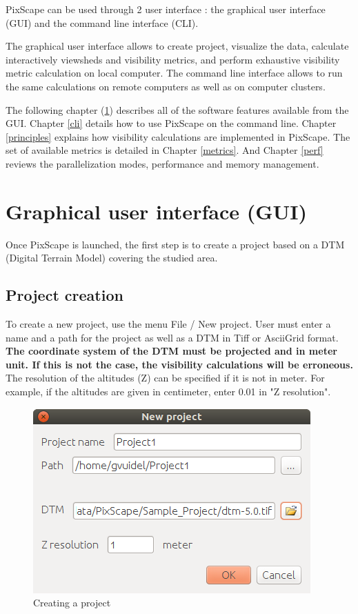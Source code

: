 \documentclass{report}
\begin{document}
PixScape can be used through 2 user interface : the graphical user interface (GUI) and the command line interface (CLI).

The graphical user interface allows to create project, visualize the data, calculate interactively viewsheds and visibility metrics, and perform exhaustive visibility metric calculation on local computer. The command line interface allows to run the same calculations on remote computers as well as on computer clusters.

The following chapter (\ref{gui}) describes all of the software features available from the GUI. Chapter \ref{cli} details how to use PixScape on the command line. Chapter \ref{principles} explains how visibility calculations are implemented in PixScape. The set of available metrics is detailed in Chapter \ref{metrics}. And Chapter \ref{perf} reviews the parallelization modes, performance and memory management.


\chapter{Graphical user interface (GUI)}
\label{gui}

Once PixScape is launched, the first step is to create a project based on a DTM (Digital Terrain Model) covering the studied area.

\section{Project creation}

To create a new project, use the menu File / New project. User must enter a name and a path for the project as well as a DTM in Tiff or AsciiGrid format. \textbf{The coordinate system of the DTM must be projected and in meter unit. If this is not the case, the visibility calculations will be erroneous.} The resolution of the altitudes (Z) can be specified if it is not in meter. For example, if the altitudes are given in centimeter, enter 0.01 in "Z resolution".

\begin{figure}[H]
	\includegraphics[scale=0.5]{img/new_project-en.png} 
	\caption{Creating a project}
\end{figure}
\end{document}
